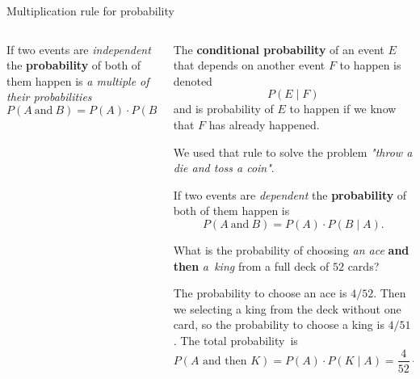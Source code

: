 \documentclass[9pt,aspectratio=169]{beamer}
\begin{document}
\begin{frame}{Multiplication rule for probability}
\begin{columns}[T]
\begin{column}{0.5\textwidth}
      \begin{definition}
        If two events are \emph{independent} the \textbf{probability} of both of them happen is \emph{a multiple of their probabilities}
        \[ P (A\ \text{and}\ B) = P (A) \cdot P (B). \] 
        \vspace*{-2ex} 
      \end{definition}
    \end{column}
    \begin{column}{0.5\textwidth}
      \begin{definition}
        The \textbf{conditional probability} of an event $E$ that depends on another event $F$ to happen is denoted 
        \[ P(E \mid F) \]
        and is probability of $E$ to happen if we know that $F$ has already happened.
      \end{definition}
      {\small We used that rule to solve the problem \emph{"throw a die and toss a coin"}.}
      \begin{definition}
        If two events are \emph{dependent} the \textbf{probability} of both of them happen is
        \[ P (A\ \text{and}\ B) = P (A) \cdot P (B \mid A). \] 
        \vspace*{-2.5ex} 
      \end{definition}
      {\small
        \begin{problem}
          What is the probability of choosing \emph{an ace} \textbf{and then} \emph{a~king} from a full deck of $52$ cards?
        \end{problem}
        The probability to choose an ace is $4/52$. Then we selecting a king from the deck without one card, so the probability to choose a king is $4/51$. The total probability~is
        \[ P(A \text{ and then } K) = P(A) \cdot P(K \mid A) = \frac{4}{52} \cdot \frac{4}{51} = \frac{4}{663}. \]
      }
    \end{column}
  \end{columns}
\end{frame}
\end{document}
